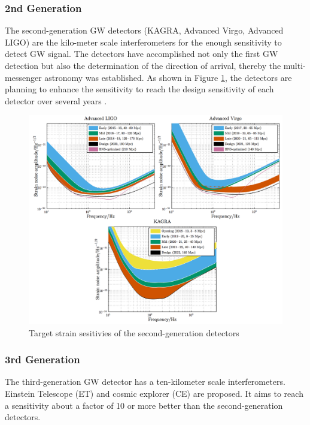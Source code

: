 \subsubsection{2nd Generation}
The second-generation GW detectors (KAGRA\cite{akutsu2017construction}, Advanced Virgo\cite{acernese2014advanced}, Advanced LIGO\cite{aasi2015advanced}) are the kilo-meter scale interferometers for the enough sensitivity to detect GW signal. The detectors have accomplished not only the first GW detection but also the determination of the direction of arrival,  thereby the multi-messenger astronomy was established. As shown in Figure \ref{img:img192}, the detectors are planning to enhance the sensitivity to reach the design sensitivity of each detector over several years \cite{abbott2018prospects}.
\begin{figure}[h]
  \begin{center}   
    \includegraphics[width=14cm]{./img_chap1/img192.png}
    \caption{Target strain sesitivies of the second-generation detectors \cite{abbott2018prospects}} \label{img:img192}
  \end{center}
\end{figure}


\subsubsection{3rd Generation}
The third-generation GW detector has a ten-kilometer scale interferometers. Einstein Telescope (ET) and cosmic explorer (CE) \cite{abbott2017exploring} are proposed. It aims to reach a sensitivity about a factor of 10 or more better than the second-generation detectors.


